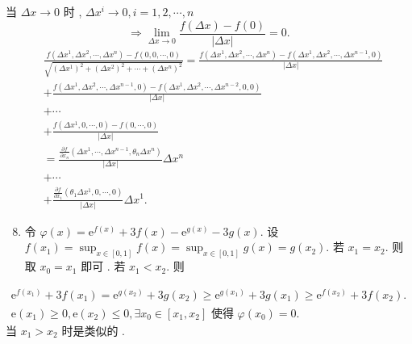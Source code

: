 \documentclass[10pt]{article}
\begin{document}
 当  $\Delta x \rightarrow 0$  时 , $\Delta x^{i} \rightarrow 0, i=1,2, \cdots, n$
$$
\Longrightarrow \lim _{\Delta x \rightarrow 0} \frac{f(\Delta x)-f(0)}{|\Delta x|}=0 .
$$
$$
\begin{aligned}
& \frac{f\left(\Delta x^{1}, \Delta x^{2}, \cdots, \Delta x^{n}\right)-f(0,0, \cdots, 0)}{\sqrt{\left(\Delta x^{1}\right)^{2}+\left(\Delta x^{2}\right)^{2}+\cdots+\left(\Delta x^{n}\right)^{2}}}=\frac{f\left(\Delta x^{1}, \Delta x^{2}, \cdots, \Delta x^{n}\right)-f\left(\Delta x^{1}, \Delta x^{2}, \cdots, \Delta x^{n-1}, 0\right)}{|\Delta x|} \\
& +\frac{f\left(\Delta x^{1}, \Delta x^{2}, \cdots, \Delta x^{n-1}, 0\right)-f\left(\Delta x^{1}, \Delta x^{2}, \cdots, \Delta x^{n-2}, 0,0\right)}{|\Delta x|} \\
& +\cdots \\
& +\frac{f\left(\Delta x^{1}, 0, \cdots, 0\right)-f(0, \cdots, 0)}{|\Delta x|} \\
& =\frac{\frac{\partial f}{\partial x_{n}}\left(\Delta x^{1}, \cdots, \Delta x^{n-1}, \theta_{n} \Delta x^{n}\right)}{|\Delta x|} \Delta x^{n} \\
& +\cdots \\
& +\frac{\frac{\partial f}{\partial x_{1}}\left(\theta_{1} \Delta x^{1}, 0, \cdots, 0\right)}{|\Delta x|} \Delta x^{1} . 
\end{aligned}
$$

\begin{enumerate}
  \setcounter{enumi}{7}
  \item  令  $\varphi(x)=\mathrm{e}^{f(x)}+3 f(x)-\mathrm{e}^{g(x)}-3 g(x)$.  设  $f\left(x_{1}\right)=\sup _{x \in[0,1]} f(x)=\sup _{x \in[0,1]} g(x)=g\left(x_{2}\right)$.  若  $x_{1}=x_{2}$.  则取  $x_{0}=x_{1}$  即可 .  若  $x_{1}<x_{2}$.  则 
\end{enumerate}
$$
\begin{gathered}
\mathrm{e}^{f\left(x_{1}\right)}+3 f\left(x_{1}\right)=\mathrm{e}^{g\left(x_{2}\right)}+3 g\left(x_{2}\right) \geq \mathrm{e}^{g\left(x_{1}\right)}+3 g\left(x_{1}\right) \geq \mathrm{e}^{f\left(x_{2}\right)}+3 f\left(x_{2}\right) . \\
\mathrm{e}\left(x_{1}\right) \geq 0, \mathrm{e}\left(x_{2}\right) \leq 0, \exists x_{0} \in\left[x_{1}, x_{2}\right] \text { 使得 } \varphi\left(x_{0}\right)=0 .
\end{gathered}
$$
 当  $x_{1}>x_{2}$  时是类似的 .
\end{document}
